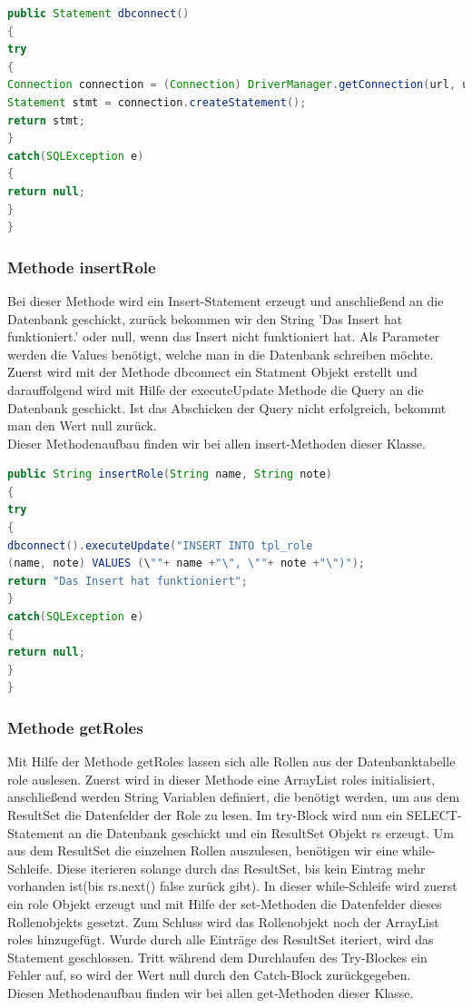 \begin{lstlisting}[language=JAVA, caption=Datenbankanbindung.java/Methode-dbconnect, firstnumber=44]
public Statement dbconnect()
{   
try
{
Connection connection = (Connection) DriverManager.getConnection(url, username, password);
Statement stmt = connection.createStatement();
return stmt;
}
catch(SQLException e)
{
return null;
}
}
\end{lstlisting}

\newpage

\subsubsection{Methode insertRole\(\)}

Bei dieser Methode wird ein Insert-Statement erzeugt und anschließend an die Datenbank geschickt, zurück bekommen wir den String 'Das Insert hat funktioniert.' oder null, wenn das Insert nicht funktioniert hat. Als Parameter werden die Values benötigt, welche man in die Datenbank schreiben möchte. Zuerst wird mit der Methode dbconnect\(\) ein Statment Objekt erstellt und darauffolgend wird mit Hilfe der executeUpdate Methode die Query an die Datenbank geschickt. Ist das Abschicken der Query nicht erfolgreich, bekommt man den Wert null zurück.\\
Dieser Methodenaufbau finden wir bei allen insert-Methoden dieser Klasse.

\begin{lstlisting}[language=JAVA, caption=Datenbankanbindung.java/Methode-dbconnect, firstnumber=271]
public String insertRole(String name, String note)
{
try
{
dbconnect().executeUpdate("INSERT INTO tpl_role 
(name, note) VALUES (\""+ name +"\", \""+ note +"\")");
return "Das Insert hat funktioniert";
}
catch(SQLException e)
{
return null;
}
}
\end{lstlisting}
\newpage
\subsubsection{Methode getRoles\(\)}

Mit Hilfe der Methode getRoles lassen sich alle Rollen aus der Datenbanktabelle role auslesen.
Zuerst wird in dieser Methode eine ArrayList roles initialisiert, anschließend werden String Variablen definiert, die benötigt werden, um aus dem ResultSet die Datenfelder der Role zu lesen.
Im try-Block wird nun ein SELECT-Statement an die Datenbank geschickt und ein ResultSet Objekt rs erzeugt. 
Um aus dem ResultSet die einzelnen Rollen auszulesen, benötigen wir eine while-Schleife. Diese iterieren solange durch das ResultSet, bis kein Eintrag mehr vorhanden ist(bis rs.next() false zurück gibt).
In dieser while-Schleife wird zuerst ein role Objekt erzeugt und mit Hilfe der set-Methoden die Datenfelder dieses Rollenobjekts gesetzt. Zum Schluss wird das Rollenobjekt noch der ArrayList roles hinzugefügt. Wurde durch alle Einträge des ResultSet iteriert, wird das Statement geschlossen. Tritt während dem Durchlaufen des Try-Blockes ein Fehler auf, so wird der Wert null durch den Catch-Block zurückgegeben.\\ 
Diesen Methodenaufbau finden wir bei allen get-Methoden dieser Klasse.

